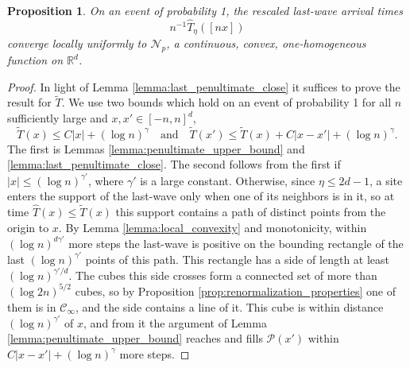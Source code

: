 \documentclass[aap]{imsart}
\newcommand{\R}{\mathbb{R}}
\newtheorem{prop}{Proposition}[section]
\begin{document}
\begin{prop} \label{prop:convergence_of_the_last_wave}
	On an event of probability 1, the rescaled last-wave arrival times 
	\[
	n^{-1} \hat{T}_{\eta}([n x])
	\] 
	converge locally uniformly to $\mathcal{N}_{p}$, a continuous, convex, one-homogeneous function on $\R^d$. 
\end{prop}
\begin{proof}
	In light of Lemma \ref{lemma:last_penultimate_close} it suffices to prove the result
	for $\tilde{T}$. We use two bounds which hold on an event of probability 1 for all $n$ sufficiently large and $x, x' \in [-n,n]^d$,
	\begin{equation} \label{eq:lastwave_lipschitz}
	\tilde{T}(x) \leq C |x| + (\log n)^{\gamma} \quad \mbox{and} \quad \tilde{T}(x') \leq \tilde{T}(x) + C|x - x'| + (\log n)^{\gamma}.
	\end{equation}
	The first is Lemmas \ref{lemma:penultimate_upper_bound} and \ref{lemma:last_penultimate_close}. The second follows from the first if $|x| \leq (\log n)^{\gamma'}$, where $\gamma'$ is a large constant. Otherwise, since $\eta \leq 2d-1$, a site enters the support of the last-wave only when one of its neighbors is in it, so at time $\hat{T}(x) \leq \tilde{T}(x)$ this support contains a path of distinct points from the origin to $x$. By Lemma \ref{lemma:local_convexity} and monotonicity, within $(\log n)^{d \gamma'}$ more steps the last-wave is positive on the bounding rectangle of the last $(\log n)^{\gamma'}$ points of this path. This rectangle has a side of length at least $(\log n)^{\gamma'/d}$. The cubes this side crosses form a connected set of more than $(\log 2n)^{5/2}$ cubes, so by Proposition \ref{prop:renormalization_properties} one of them is in $\mathcal{C}_{\infty}$, and the side contains a line of it. This cube is within distance $(\log n)^{\gamma'}$ of $x$, and from it the argument of Lemma \ref{lemma:penultimate_upper_bound} reaches and fills $\mathcal{P}(x')$ within $C|x - x'| + (\log n)^{\gamma}$ more steps.


\end{proof}
\end{document}
